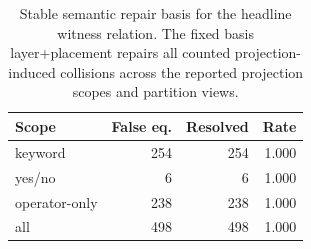 \begin{table}[H]
\centering
\caption{Stable semantic repair basis for the headline witness relation. The fixed basis layer+placement repairs all counted projection-induced collisions across the reported projection scopes and partition views.}
\label{tab:repair-basis-stability}
\begin{tabular}{lrrr}
\toprule
Scope & False eq. & Resolved & Rate \\
\midrule
keyword & 254 & 254 & 1.000 \\
yes/no & 6 & 6 & 1.000 \\
operator-only & 238 & 238 & 1.000 \\
all & 498 & 498 & 1.000 \\
\bottomrule
\end{tabular}
\end{table}
